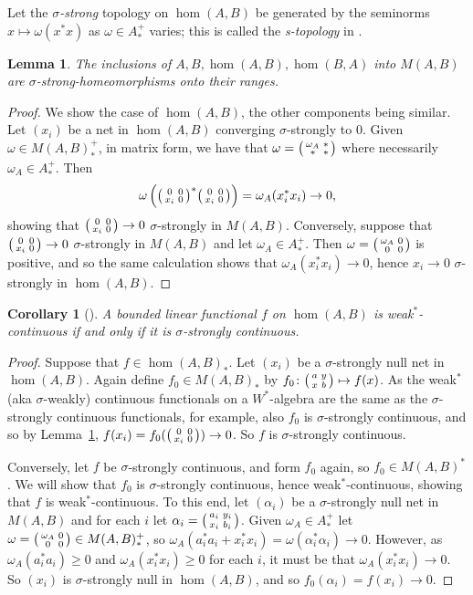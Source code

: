 \documentclass[a4paper,11pt]{article}
\theoremstyle{plain}
\newtheorem{corollary}[proposition]{Corollary}
\newtheorem{lemma}[proposition]{Lemma}
\theoremstyle{remark}
\newenvironment{smat}{\bigl(\begin{smallmatrix}}{\end{smallmatrix}\bigr)}
\newcommand{\smattwo}[4]{\begin{smat}{#1}&{#2}\\{#3}&{#4}\end{smat}}
\begin{document}
Let the \emph{$\sigma$-strong} topology on $\hom(A,B)$ be generated by the seminorms $x \mapsto \omega(x^*x)$ as $\omega\in A_*^+$ varies; this is called the \emph{s-topology} in \cite{GLR_Wstar_categories}.

\begin{lemma}\label{lem:inc_coms_sigmastrongly}
The inclusions of $A,B,\hom(A,B),\hom(B,A)$ into $M(A,B)$ are $\sigma$-strong-homeomorphisms onto their ranges.
\end{lemma}
\begin{proof}
We show the case of $\hom(A,B)$, the other components being similar.  Let $(x_i)$ be a net in $\hom(A,B)$ converging $\sigma$-strongly to $0$.  Given $\omega\in M(A,B)_*^+$, in matrix form, we have that $\omega = \smattwo{\omega_A}{*}{*}{*}$ where necessarily $\omega_A \in A_*^+$.  Then
\[ \omega\left( \smattwo{0}{0}{x_i}{0}^* \smattwo{0}{0}{x_i}{0} \right)
= \omega_A(x_i^*x_i) \to 0, \]
showing that $\smattwo{0}{0}{x_i}{0} \to 0$ $\sigma$-strongly in $M(A,B)$.  Conversely, suppose that $\smattwo{0}{0}{x_i}{0} \to 0$ $\sigma$-strongly in $M(A,B)$ and let $\omega_A \in A_*^+$.  Then $\omega = \smattwo{\omega_A}{0}{0}{0}$ is positive, and so the same calculation shows that $\omega_A(x_i^*x_i) \to 0$, hence $x_i\to0$ $\sigma$-strongly in $\hom(A,B)$.
\end{proof}

\begin{corollary}[{\cite[Corollary~2.9]{GLR_Wstar_categories}}]\label{corr:wscts_strlycts}
A bounded linear functional $f$ on $\hom(A,B)$ is weak$^*$-continuous if and only if it is $\sigma$-strongly continuous.
\end{corollary}
\begin{proof}
Suppose that $f\in\hom(A,B)_*$.  Let $(x_i)$ be a $\sigma$-strongly null net in $\hom(A,B)$.  Again define $f_0 \in M(A,B)_*$ by $f_0 \colon \smattwo{a}{y}{x}{b} \mapsto f(x)$.  As the weak$^*$ (aka $\sigma$-weakly) continuous functionals on a $W^*$-algebra are the same as the $\sigma$-strongly continuous functionals, \cite[Theorem~II.2.6(ii)]{TakesakiI} for example, also $f_0$ is $\sigma$-strongly continuous, and so by Lemma~\ref{lem:inc_coms_sigmastrongly}, $f(x_i) = f_0(\smattwo{0}{0}{x_i}{0}) \to 0$.  So $f$ is $\sigma$-strongly continuous.

Conversely, let $f$ be $\sigma$-strongly continuous, and form $f_0$ again, so $f_0 \in M(A,B)^*$.  We will show that $f_0$ is $\sigma$-strongly continuous, hence weak$^*$-continuous, showing that $f$ is weak$^*$-continuous.  To this end, let $(\alpha_i)$ be a $\sigma$-strongly null net in $M(A,B)$ and for each $i$ let $\alpha_i = \smattwo{a_i}{y_i}{x_i}{b_i}$.  Given $\omega_A \in A_*^+$ let $\omega = \smattwo{\omega_A}{0}{0}{0} \in M(A,B)_*^+$, so $\omega_A(a_i^*a_i + x_i^*x_i) = \omega(\alpha_i^*\alpha_i) \to 0$.  However, as $\omega_A(a_i^*a_i)\geq 0$ and $\omega_A(x_i^*x_i)\geq 0$ for each $i$, it must be that $\omega_A(x_i^*x_i) \to 0$.  So $(x_i)$ is $\sigma$-strongly null in $\hom(A,B)$, and so $f_0(\alpha_i) = f(x_i) \to 0$.
\end{proof}
\end{document}
